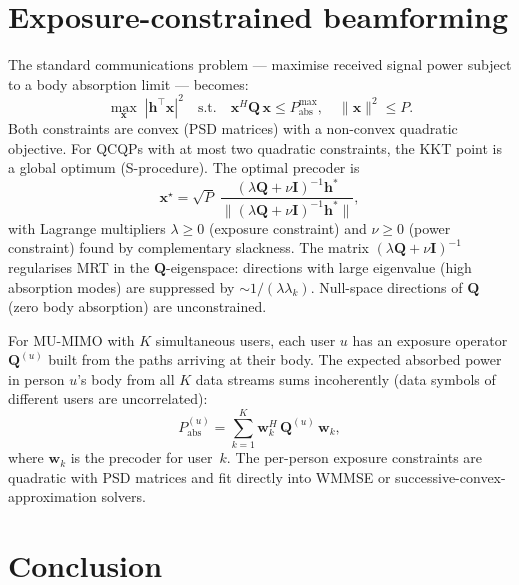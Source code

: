 \documentclass[11pt,a4paper]{article}
\theoremstyle{definition}
\begin{document}
\section{Exposure-constrained beamforming}\label{sec:ecbf}

The standard communications problem — maximise received signal power
subject to a body absorption limit — becomes:
\begin{equation}\label{eq:QCQP}
  \max_{\mathbf{x}}\;|{\mathbf{h}^\top\mathbf{x}}|^2
  \quad\text{s.t.}\quad
  \mathbf{x}^H\mathbf{Q}\,\mathbf{x}\le P_{\mathrm{abs}}^{\max},
  \quad\|\mathbf{x}\|^2\le P.
\end{equation}
Both constraints are convex (PSD matrices) with a non-convex quadratic
objective.  For QCQPs with at most two quadratic constraints, the
KKT point is a global optimum (S-procedure).  The optimal precoder is
\begin{equation}\label{eq:optimal-x}
  \boxed{\mathbf{x}^\star = \sqrt{P}\;
    \frac{(\lambda\mathbf{Q}+\nu\mathbf{I})^{-1}\mathbf{h}^*}
         {\|(\lambda\mathbf{Q}+\nu\mathbf{I})^{-1}\mathbf{h}^*\|},}
\end{equation}
with Lagrange multipliers $\lambda\ge 0$ (exposure constraint) and
$\nu\ge 0$ (power constraint) found by complementary slackness.  The
matrix $(\lambda\mathbf{Q}+\nu\mathbf{I})^{-1}$ regularises MRT in the
$\mathbf{Q}$-eigenspace: directions with large eigenvalue (high
absorption modes) are suppressed by $\sim 1/(\lambda\lambda_k)$.
Null-space directions of $\mathbf{Q}$ (zero body absorption) are
unconstrained.

For MU-MIMO with $K$ simultaneous users, each user $u$ has an exposure
operator $\mathbf{Q}^{(u)}$ built from the paths arriving at their body.
The expected absorbed power in person $u$'s body from all $K$ data
streams sums incoherently (data symbols of different users are
uncorrelated):
\begin{equation}\label{eq:Pabs-MU}
  P_{\mathrm{abs}}^{(u)} = \sum_{k=1}^K \mathbf{w}_k^H\,\mathbf{Q}^{(u)}\,\mathbf{w}_k,
\end{equation}
where $\mathbf{w}_k$ is the precoder for user~$k$.  The per-person
exposure constraints are quadratic with PSD matrices and fit directly
into WMMSE or successive-convex-approximation solvers.

\section{Conclusion}\label{sec:conclusion}
\end{document}
